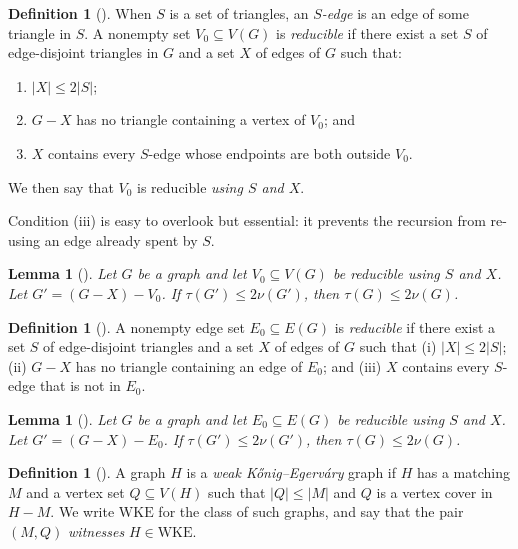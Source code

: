 \documentclass[11pt,a4paper]{amsart}
\theoremstyle{plain}
\newtheorem{lemma}[theorem]{Lemma}
\theoremstyle{definition}
\newtheorem{definition}[theorem]{Definition}
\newcommand{\WKE}{\mathrm{WKE}}
\begin{document}
\begin{definition}[{\cite[Definition 2.1]{Puleo2015}}]\label{def:reducible}
When $S$ is a set of triangles, an \emph{$S$-edge} is an edge of some triangle
in $S$. A nonempty set $V_0\subseteq V(G)$ is \emph{reducible} if there exist
a set $S$ of edge-disjoint triangles in $G$ and a set $X$ of edges of $G$ such
that:
\begin{enumerate}
  \item[(i)] $|X|\le 2|S|$;
  \item[(ii)] $G-X$ has no triangle containing a vertex of $V_0$; and
  \item[(iii)] $X$ contains every $S$-edge whose endpoints are both outside
    $V_0$.
\end{enumerate}
We then say that $V_0$ is reducible \emph{using $S$ and $X$}.
\end{definition}

Condition (iii) is easy to overlook but essential: it prevents the recursion
from re-using an edge already spent by $S$.

\begin{lemma}[{\cite[Lemma 2.2]{Puleo2015}}]\label{lem:puleo22}
Let $G$ be a graph and let $V_0\subseteq V(G)$ be reducible using $S$ and $X$.
Let $G'=(G-X)-V_0$. If $\tau(G')\le 2\nu(G')$, then $\tau(G)\le 2\nu(G)$.
\end{lemma}

\begin{definition}[{\cite[Definition 4.2]{Puleo2015}}]\label{def:redgeset}
A nonempty edge set $E_0\subseteq E(G)$ is \emph{reducible} if there exist a
set $S$ of edge-disjoint triangles and a set $X$ of edges of $G$ such that
(i) $|X|\le 2|S|$; (ii) $G-X$ has no triangle containing an edge of $E_0$;
and (iii) $X$ contains every $S$-edge that is not in $E_0$.
\end{definition}

\begin{lemma}[{\cite[Lemma 4.3]{Puleo2015}}]\label{lem:puleo43}
Let $G$ be a graph and let $E_0\subseteq E(G)$ be reducible using $S$ and $X$.
Let $G'=(G-X)-E_0$. If $\tau(G')\le 2\nu(G')$, then $\tau(G)\le 2\nu(G)$.
\end{lemma}

\begin{definition}[{\cite[Definition 4.1]{Puleo2015}}]\label{def:wke}
A graph $H$ is a \emph{weak K\H{o}nig--Egerv\'ary} graph if $H$ has a matching
$M$ and a vertex set $Q\subseteq V(H)$ such that $|Q|\le|M|$ and $Q$ is a
vertex cover in $H-M$. We write $\WKE$ for the class of such graphs, and say
that the pair $(M,Q)$ \emph{witnesses} $H\in\WKE$.
\end{definition}
\end{document}
